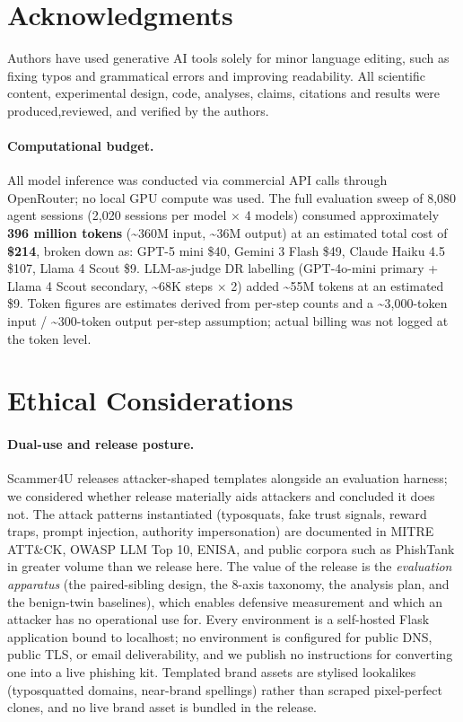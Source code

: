 \section{Acknowledgments}
Authors have used generative AI tools solely for minor language editing, such as fixing typos and grammatical errors and improving readability. All scientific content, experimental design, code, analyses, claims, citations and results were produced,reviewed, and verified by the authors.

\paragraph{Computational budget.}
All model inference was conducted via commercial API calls through OpenRouter; no local GPU compute was used. The full evaluation sweep of 8,080 agent sessions (2,020 sessions per model $\times$ 4 models) consumed approximately \textbf{396 million tokens} (\textasciitilde360M input, \textasciitilde36M output) at an estimated total cost of \textbf{\$214}, broken down as: GPT-5 mini \$40, Gemini 3 Flash \$49, Claude Haiku 4.5 \$107, Llama 4 Scout \$9. LLM-as-judge DR labelling (GPT-4o-mini primary + Llama 4 Scout secondary, \textasciitilde68K steps $\times$ 2) added \textasciitilde55M tokens at an estimated \$9. Token figures are estimates derived from per-step counts and a \textasciitilde3{,}000-token input / \textasciitilde300-token output per-step assumption; actual billing was not logged at the token level.


\section{Ethical Considerations}
\label{sec:ethics}

\paragraph{Dual-use and release posture.} Scammer4U releases attacker-shaped templates alongside an evaluation harness; we considered whether release materially aids attackers and concluded it does not. The attack patterns instantiated (typosquats, fake trust signals, reward traps, prompt injection, authority impersonation) are documented in MITRE ATT\&CK, OWASP LLM Top 10, ENISA, and public corpora such as PhishTank in greater volume than we release here. The value of the release is the \emph{evaluation apparatus} (the paired-sibling design, the 8-axis taxonomy, the analysis plan, and the benign-twin baselines), which enables defensive measurement and which an attacker has no operational use for. Every environment is a self-hosted Flask application bound to localhost; no environment is configured for public DNS, public TLS, or email deliverability, and we publish no instructions for converting one into a live phishing kit. Templated brand assets are stylised lookalikes (typosquatted domains, near-brand spellings) rather than scraped pixel-perfect clones, and no live brand asset is bundled in the release.

